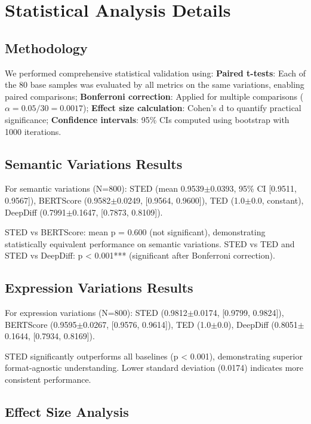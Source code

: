 \documentclass{article}
\theoremstyle{plain}
\theoremstyle{definition}
\begin{document}
\section{Statistical Analysis Details}
\label{sec:statistical-analysis}

\subsection{Methodology}

We performed comprehensive statistical validation using: \textbf{Paired t-tests}: Each of the 80 base samples was evaluated by all metrics on the same variations, enabling paired comparisons; \textbf{Bonferroni correction}: Applied for multiple comparisons ($\alpha = 0.05/30 = 0.0017$); \textbf{Effect size calculation}: Cohen's d to quantify practical significance; \textbf{Confidence intervals}: 95\% CIs computed using bootstrap with 1000 iterations.

\subsection{Semantic Variations Results}

For semantic variations (N=800): STED (mean 0.9539$\pm$0.0393, 95\% CI [0.9511, 0.9567]), BERTScore (0.9582$\pm$0.0249, [0.9564, 0.9600]), TED (1.0$\pm$0.0, constant), DeepDiff (0.7991$\pm$0.1647, [0.7873, 0.8109]).

STED vs BERTScore: mean p = 0.600 (not significant), demonstrating statistically equivalent performance on semantic variations. STED vs TED and STED vs DeepDiff: p < 0.001*** (significant after Bonferroni correction).

\subsection{Expression Variations Results}

For expression variations (N=800): STED (0.9812$\pm$0.0174, [0.9799, 0.9824]), BERTScore (0.9595$\pm$0.0267, [0.9576, 0.9614]), TED (1.0$\pm$0.0), DeepDiff (0.8051$\pm$0.1644, [0.7934, 0.8169]).

STED significantly outperforms all baselines (p < 0.001), demonstrating superior format-agnostic understanding. Lower standard deviation (0.0174) indicates more consistent performance.

\subsection{Effect Size Analysis}
\end{document}
